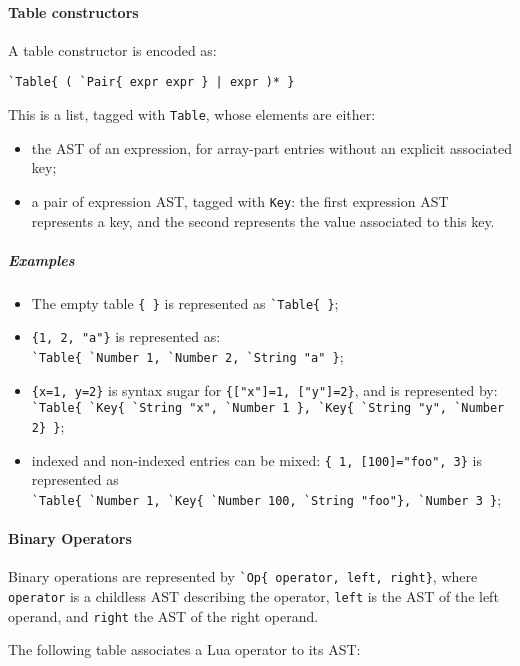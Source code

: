 \paragraph{Table constructors}
A table constructor is encoded as:

\verb+`Table{ ( `Pair{ expr expr } | expr )* }+

This is a list, tagged with \verb+Table+, whose elements are either:
\begin{itemize}
\item the AST of an expression, for array-part entries without an
  explicit associated key;
\item a pair of expression AST, tagged with \verb+Key+: the first
  expression AST represents a key, and the second represents the value
  associated to this key.
\end{itemize}

\subparagraph{Examples}
\begin{itemize}

\item The empty table \verb+{ }+ is represented as \verb+`Table{ }+;

\item \verb+{1, 2, "a"}+ is represented as:\\
  \verb+`Table{ `Number 1, `Number 2, `String "a" }+;

\item \verb+{x=1, y=2}+ is syntax sugar for \verb+{["x"]=1, ["y"]=2}+,
  and is represented by:\\
  \verb+`Table{ `Key{ `String "x", `Number 1 }, `Key{ `String "y", `Number 2} }+;

\item indexed and non-indexed entries can be mixed:
  \verb+{ 1, [100]="foo", 3}+ is represented as \\
  \verb+`Table{ `Number 1, `Key{ `Number 100, `String "foo"}, `Number 3 }+;

\end{itemize}

\paragraph{Binary Operators}
Binary operations are represented by
\verb+`Op{ operator, left, right}+, where \verb+operator+ is a
childless AST describing the operator, \verb+left+ is the AST of the
left operand, and \verb+right+ the AST of the right operand.

The following table associates a Lua operator to its AST:

